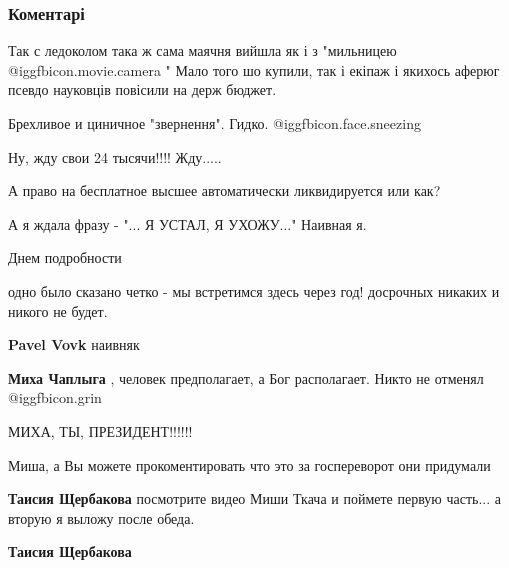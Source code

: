  
 
 
 
 
\subsubsection{Коментарі}

\begin{itemize} %

Так с ледоколом така ж сама маячня вийшла як і з "мильницею  @igg{fbicon.movie.camera} " Мало того шо
купили, так і екіпаж і якихось аферюг псевдо науковців повісили на держ бюджет.


Брехливое и циничное "звернення". Гидко. @igg{fbicon.face.sneezing} 

Ну, жду свои 24 тысячи!!!! Жду.....

А право на бесплатное высшее автоматически ликвидируется или как?

А я ждала фразу - "... Я УСТАЛ, Я УХОЖУ..." Наивная я.

Днем подробности

одно было сказано четко - мы встретимся здесь через год! досрочных никаких и никого не будет.

\begin{itemize} %
\textbf{Pavel Vovk} наивняк

\textbf{Миха Чаплыга} , человек предполагает, а Бог располагает. Никто не отменял @igg{fbicon.grin} 

МИХА, ТЫ, ПРЕЗИДЕНТ!!!!!!
\end{itemize} %

Миша, а Вы можете прокоментировать что это за госпереворот они придумали

\begin{itemize} %
\textbf{Таисия Щербакова} посмотрите видео Миши Ткача и поймете первую часть... а вторую я выложу после обеда.

\textbf{Таисия Щербакова}


\end{itemize}
\end{itemize}
